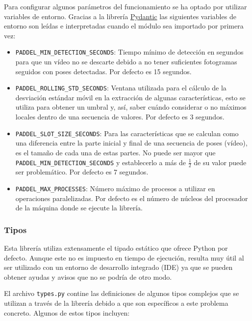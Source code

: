 Para configurar algunos parámetros del funcionamiento se ha optado por utilizar
variables de entorno. Gracias a la librería
\href{https://docs.pydantic.dev/latest/}{Pydantic} las siguientes variables de
entorno son leídas e interpretadas cuando el módulo sea importado por primera
vez:

\begin{itemize}
    \item \texttt{PADDEL\_MIN\_DETECTION\_SECONDS}: Tiempo mínimo de detección en
    segundos para que un vídeo no se descarte debido a no tener suficientes
    fotogramas seguidos con poses detectadas. Por defecto es 15 segundos.
    \item \texttt{PADDEL\_ROLLING\_STD\_SECONDS}: Ventana utilizada para el
    cálculo de la desviación estándar móvil en la extracción de algunas
    características, esto se utiliza para obtener un umbral y, así, saber cuándo
    considerar o no máximos locales dentro de una secuencia de valores. Por
    defecto es 3 segundos.
    \item \texttt{PADDEL\_SLOT\_SIZE\_SECONDS}: Para las características que se
    calculan como una diferencia entre la parte inicial y final de una secuencia
    de poses (vídeo), es el tamaño de cada una de estas partes. No puede ser
    mayor que \texttt{PADDEL\_MIN\_DETECTION\_SECONDS} y establecerlo a más de
    $\frac{1}{2}$ de su valor puede ser problemático. Por defecto es 7 segundos.
    \item \texttt{PADDEL\_MAX\_PROCESSES}: Número máximo de procesos a utilizar en
    operaciones paralelizadas. Por defecto es el número de núcleos del
    procesador de la máquina donde se ejecute la librería.
\end{itemize}

\subsubsection{Tipos}

Esta librería utiliza extensamente el tipado estático que ofrece Python por
defecto. Aunque este no es impuesto en tiempo de ejecución, resulta muy útil al
ser utilizado con un entorno de desarrollo integrado (IDE) ya que se pueden
obtener ayudas y avisos que no se podría de otro modo.

El archivo \texttt{types.py} contine las definiciones de algunos tipos complejos
que se utilizan a través de la librería debido a que son específicos a este
problema concreto. Algunos de estos tipos incluyen:


